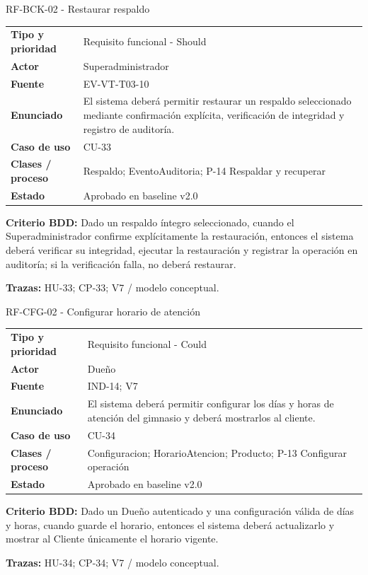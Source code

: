 \begin{reqbox}{RF-BCK-02 - Restaurar respaldo}
\begin{tabularx}{\textwidth}{>{\bfseries}p{3.2cm}Y}
Tipo y prioridad & Requisito funcional - Should \\
Actor & Superadministrador \\
Fuente & EV-VT-T03-10 \\
Enunciado & El sistema deberá permitir restaurar un respaldo seleccionado mediante confirmación explícita, verificación de integridad y registro de auditoría. \\
Caso de uso & CU-33 \\
Clases / proceso & Respaldo; EventoAuditoria; P-14 Respaldar y recuperar \\
Estado & Aprobado en baseline v2.0 \\
\end{tabularx}
\textbf{Criterio BDD:} Dado un respaldo íntegro seleccionado, cuando el Superadministrador confirme explícitamente la restauración, entonces el sistema deberá verificar su integridad, ejecutar la restauración y registrar la operación en auditoría; si la verificación falla, no deberá restaurar.

\textbf{Trazas:} HU-33; CP-33; V7 / modelo conceptual.
\end{reqbox}


\begin{reqbox}{RF-CFG-02 - Configurar horario de atención}
\begin{tabularx}{\textwidth}{>{\bfseries}p{3.2cm}Y}
Tipo y prioridad & Requisito funcional - Could \\
Actor & Dueño \\
Fuente & IND-14; V7 \\
Enunciado & El sistema deberá permitir configurar los días y horas de atención del gimnasio y deberá mostrarlos al cliente. \\
Caso de uso & CU-34 \\
Clases / proceso & Configuracion; HorarioAtencion; Producto; P-13 Configurar operación \\
Estado & Aprobado en baseline v2.0 \\
\end{tabularx}
\textbf{Criterio BDD:} Dado un Dueño autenticado y una configuración válida de días y horas, cuando guarde el horario, entonces el sistema deberá actualizarlo y mostrar al Cliente únicamente el horario vigente.

\textbf{Trazas:} HU-34; CP-34; V7 / modelo conceptual.
\end{reqbox}


